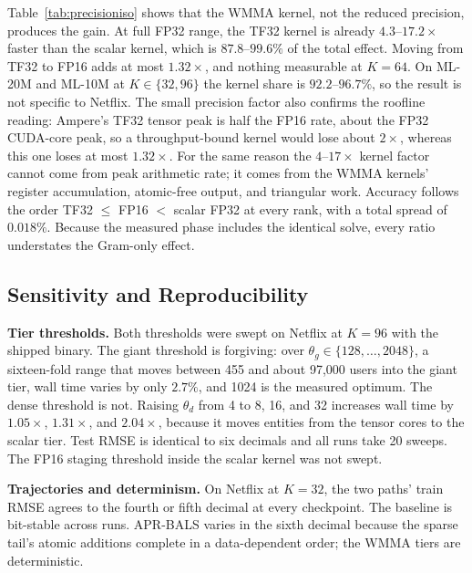 Table~\ref{tab:precisioniso} shows that the WMMA kernel, not the reduced precision, produces the gain. At full FP32 range, the TF32 kernel is already $4.3$--$17.2\times$ faster than the scalar kernel, which is $87.8$--$99.6\%$ of the total effect. Moving from TF32 to FP16 adds at most $1.32\times$, and nothing measurable at $K=64$. On ML-20M and ML-10M at $K \in \{32, 96\}$ the kernel share is $92.2$--$96.7\%$, so the result is not specific to Netflix. The small precision factor also confirms the roofline reading: Ampere's TF32 tensor peak is half the FP16 rate, about the FP32 CUDA-core peak, so a throughput-bound kernel would lose about $2\times$, whereas this one loses at most $1.32\times$. For the same reason the $4$--$17\times$ kernel factor cannot come from peak arithmetic rate; it comes from the WMMA kernels' register accumulation, atomic-free output, and triangular work. Accuracy follows the order TF32 $\le$ FP16 $<$ scalar FP32 at every rank, with a total spread of $0.018\%$. Because the measured phase includes the identical solve, every ratio understates the Gram-only effect.

\subsection{Sensitivity and Reproducibility}
\label{ssec:sensitivity}

\textbf{Tier thresholds.} Both thresholds were swept on Netflix at $K=96$ with the shipped binary. The giant threshold is forgiving: over $\theta_g \in \{128, \dots, 2048\}$, a sixteen-fold range that moves between 455 and about 97{,}000 users into the giant tier, wall time varies by only $2.7\%$, and 1024 is the measured optimum. The dense threshold is not. Raising $\theta_d$ from 4 to 8, 16, and 32 increases wall time by $1.05\times$, $1.31\times$, and $2.04\times$, because it moves entities from the tensor cores to the scalar tier. Test RMSE is identical to six decimals and all runs take 20 sweeps. The FP16 staging threshold inside the scalar kernel was not swept.

\textbf{Trajectories and determinism.} On Netflix at $K=32$, the two paths' train RMSE agrees to the fourth or fifth decimal at every checkpoint. The baseline is bit-stable across runs. APR-BALS varies in the sixth decimal because the sparse tail's atomic additions complete in a data-dependent order; the WMMA tiers are deterministic.
